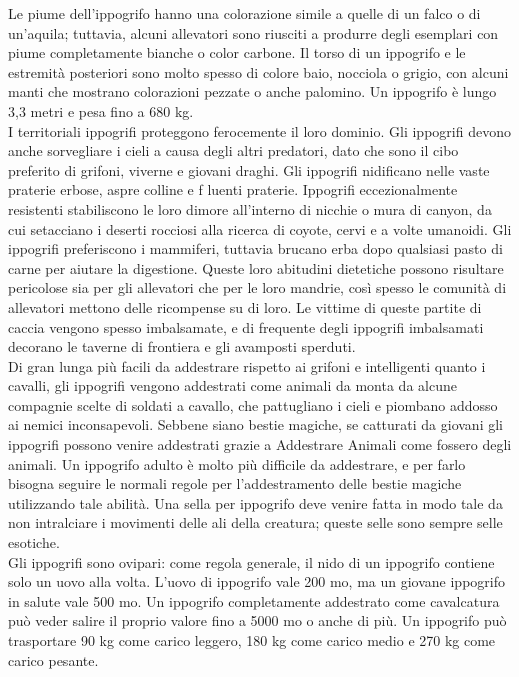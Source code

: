 \begin{multicols}{2}
Le piume dell'ippogrifo hanno una colorazione simile a quelle di un falco o di un'aquila; tuttavia, alcuni allevatori sono riusciti a produrre degli esemplari con piume completamente bianche o color carbone. Il torso di un ippogrifo e le estremità posteriori sono molto spesso di colore baio, nocciola o grigio, con alcuni manti che mostrano colorazioni pezzate o anche palomino. Un ippogrifo è lungo 3,3 metri e pesa fino a 680 kg.\\

I territoriali ippogrifi proteggono ferocemente il loro dominio. Gli ippogrifi devono anche sorvegliare i cieli a causa degli altri predatori, dato che sono il cibo preferito di grifoni, viverne e giovani draghi. Gli ippogrifi nidificano nelle vaste praterie erbose, aspre colline e f luenti praterie. Ippogrifi eccezionalmente resistenti stabiliscono le loro dimore all'interno di nicchie o mura di canyon, da cui setacciano i deserti rocciosi alla ricerca di coyote, cervi e a volte umanoidi. Gli ippogrifi preferiscono i mammiferi, tuttavia brucano erba dopo qualsiasi pasto di carne per aiutare la digestione. Queste loro abitudini dietetiche possono risultare pericolose sia per gli allevatori che per le loro mandrie, così spesso le comunità di allevatori mettono delle ricompense su di loro. Le vittime di queste partite di caccia vengono spesso imbalsamate, e di frequente degli ippogrifi imbalsamati decorano le taverne di frontiera e gli avamposti sperduti.\\

Di gran lunga più facili da addestrare rispetto ai grifoni e intelligenti quanto i cavalli, gli ippogrifi vengono addestrati come animali da monta da alcune compagnie scelte di soldati a cavallo, che pattugliano i cieli e piombano addosso ai nemici inconsapevoli. Sebbene siano bestie magiche, se catturati da giovani gli ippogrifi possono venire addestrati grazie a Addestrare Animali come fossero degli animali. Un ippogrifo adulto è molto più difficile da addestrare, e per farlo bisogna seguire le normali regole per l'addestramento delle bestie magiche utilizzando tale abilità. Una sella per ippogrifo deve venire fatta in modo tale da non intralciare i movimenti delle ali della creatura; queste selle sono sempre selle esotiche.\\

Gli ippogrifi sono ovipari: come regola generale, il nido di un ippogrifo contiene solo un uovo alla volta. L'uovo di ippogrifo vale 200 mo, ma un giovane ippogrifo in salute vale 500 mo. Un ippogrifo completamente addestrato come cavalcatura può veder salire il proprio valore fino a 5000 mo o anche di più. Un ippogrifo può trasportare 90 kg come carico leggero, 180 kg come carico medio e 270 kg come carico pesante.\\



\end{multicols}
